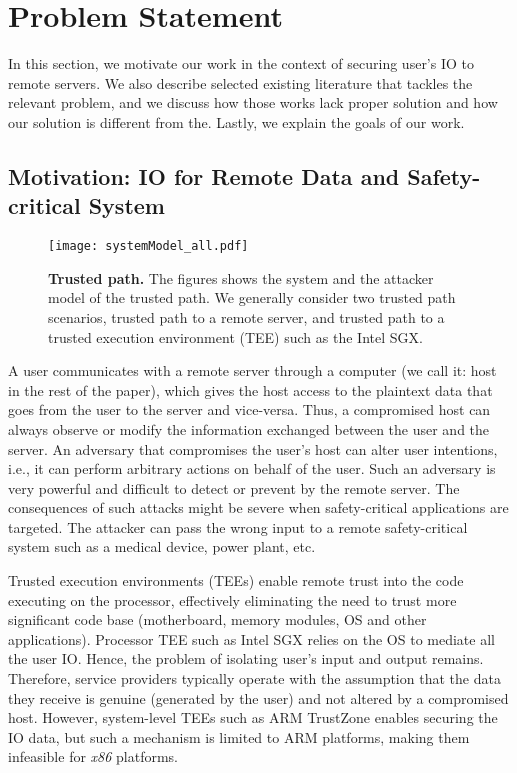 \section{Problem Statement}
\label{sec:problemStatement}

In this section, we motivate our work in the context of securing user's IO to remote servers. We also describe selected existing literature that tackles the relevant problem, and we discuss how those works lack proper solution and how our solution is different from the. Lastly, we explain the goals of our work.

\subsection{Motivation: IO for Remote Data and Safety-critical System}

\begin{figure}[t]
\centering
\texttt{[image: systemModel\_all.pdf]}
\caption{\textbf{Trusted path.} The figures shows the system and the attacker model of the trusted path. We generally consider two trusted path scenarios, \one trusted path to a remote server, and \two trusted path to a trusted execution environment (TEE) such as the Intel SGX.}
\label{fig:trustedPath}
\centering
\end{figure}

A user communicates with a remote server through a computer (we call it: host in the rest of the paper), which gives the host access to the plaintext data that goes from the user to the server and vice-versa. Thus, a compromised host can always observe or modify the information exchanged between the user and the server. An adversary that compromises the user's host can alter user intentions, i.e., it can perform arbitrary actions on behalf of the user. Such an adversary is very powerful and difficult to detect or prevent by the remote server. The consequences of such attacks might be severe when safety-critical applications are targeted. The attacker can pass the wrong input to a remote safety-critical system such as a medical device, power plant, etc. 

Trusted execution environments (TEEs) enable remote trust into the code executing on the processor, effectively eliminating the need to trust more significant code base (motherboard, memory modules, OS and other applications). Processor TEE such as Intel SGX relies on the OS to mediate all the user IO. Hence, the problem of isolating user's input and output remains. Therefore, service providers typically operate with the assumption that the data they receive is genuine (generated by the user) and not altered by a compromised host. However, system-level TEEs such as ARM TrustZone enables securing the IO data, but such a mechanism is limited to ARM platforms, making them infeasible for \emph{x86} platforms.

